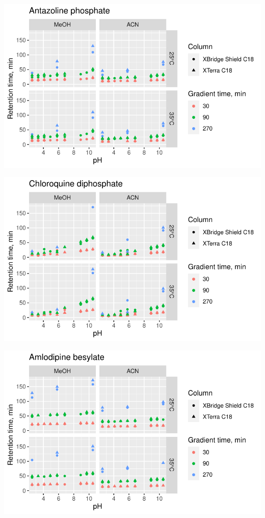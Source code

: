 \documentclass[
  letterpaper,
  DIV=11,
  numbers=noendperiod]{scrreprt}
\begin{document}
\includegraphics{index_files/figure-pdf/unnamed-chunk-4-90.pdf}

\includegraphics{index_files/figure-pdf/unnamed-chunk-4-91.pdf}

\includegraphics{index_files/figure-pdf/unnamed-chunk-4-92.pdf}
\end{document}
